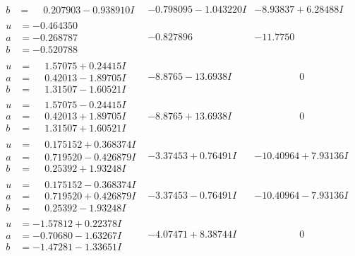 \documentclass[1p]{elsarticle_modified}
\theoremstyle{definition}
\begin{document}
$$\begin{array}{c|c|c}
\begin{aligned}
b &= \phantom{-}0.207903 - 0.938910 I\end{aligned}
 & -0.798095 - 1.043220 I & -8.93837 + 6.28488 I \\ \hline\begin{aligned}
u &= -0.464350\phantom{ +0.000000I} \\
a &= -0.268787\phantom{ +0.000000I} \\
b &= -0.520788\phantom{ +0.000000I}\end{aligned}
 & -0.827896\phantom{ +0.000000I} & -11.7750\phantom{ +0.000000I} \\ \hline\begin{aligned}
u &= \phantom{-}1.57075 + 0.24415 I \\
a &= \phantom{-}0.42013 - 1.89705 I \\
b &= \phantom{-}1.31507 - 1.60521 I\end{aligned}
 & -8.8765 - 13.6938 I & \phantom{-0.000000 } 0 \\ \hline\begin{aligned}
u &= \phantom{-}1.57075 - 0.24415 I \\
a &= \phantom{-}0.42013 + 1.89705 I \\
b &= \phantom{-}1.31507 + 1.60521 I\end{aligned}
 & -8.8765 + 13.6938 I & \phantom{-0.000000 } 0 \\ \hline\begin{aligned}
u &= \phantom{-}0.175152 + 0.368374 I \\
a &= \phantom{-}0.719520 - 0.426879 I \\
b &= \phantom{-}0.25392 + 1.93248 I\end{aligned}
 & -3.37453 + 0.76491 I & -10.40964 + 7.93136 I \\ \hline\begin{aligned}
u &= \phantom{-}0.175152 - 0.368374 I \\
a &= \phantom{-}0.719520 + 0.426879 I \\
b &= \phantom{-}0.25392 - 1.93248 I\end{aligned}
 & -3.37453 - 0.76491 I & -10.40964 - 7.93136 I \\ \hline\begin{aligned}
u &= -1.57812 + 0.22378 I \\
a &= -0.70680 - 1.63267 I \\
b &= -1.47281 - 1.33651 I\end{aligned}
 & -4.07471 + 8.38744 I & \phantom{-0.000000 } 0 \\ \hline\begin{aligned}

\end{aligned}
\end{array}$$
\end{document}
